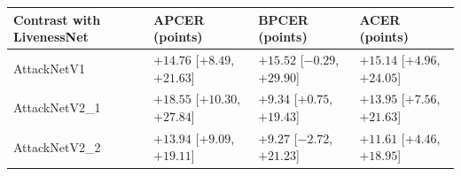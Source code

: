 \begin{tabular}{llll}
\hline
Contrast with LivenessNet & APCER (points) & BPCER (points) & ACER (points) \\
\hline
AttackNetV1 & $+14.76$ [$+8.49$, $+21.63$] & $+15.52$ [$-0.29$, $+29.90$] & $+15.14$ [$+4.96$, $+24.05$] \\
AttackNetV2\_1 & $+18.55$ [$+10.30$, $+27.84$] & $+9.34$ [$+0.75$, $+19.43$] & $+13.95$ [$+7.56$, $+21.63$] \\
AttackNetV2\_2 & $+13.94$ [$+9.09$, $+19.11$] & $+9.27$ [$-2.72$, $+21.23$] & $+11.61$ [$+4.46$, $+18.95$] \\
\hline
\end{tabular}
